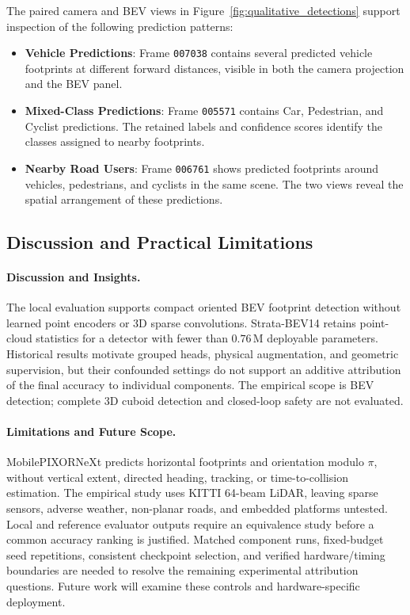 The paired camera and BEV views in Figure~\ref{fig:qualitative_detections} support inspection of the following prediction patterns:
\begin{itemize}
    \item \textbf{Vehicle Predictions}: Frame \texttt{007038} contains several predicted vehicle footprints at different forward distances, visible in both the camera projection and the BEV panel.
    \item \textbf{Mixed-Class Predictions}: Frame \texttt{005571} contains Car, Pedestrian, and Cyclist predictions. The retained labels and confidence scores identify the classes assigned to nearby footprints.
    \item \textbf{Nearby Road Users}: Frame \texttt{006761} shows predicted footprints around vehicles, pedestrians, and cyclists in the same scene. The two views reveal the spatial arrangement of these predictions.
\end{itemize}

\subsection{Discussion and Practical Limitations}
\label{sec:discussion_limitations}

\paragraph{Discussion and Insights.}
The local evaluation supports compact oriented BEV footprint detection without learned point encoders or 3D sparse convolutions. Strata-BEV14 retains point-cloud statistics for a detector with fewer than $0.76\,\text{M}$ deployable parameters. Historical results motivate grouped heads, physical augmentation, and geometric supervision, but their confounded settings do not support an additive attribution of the final accuracy to individual components. The empirical scope is BEV detection; complete 3D cuboid detection and closed-loop safety are not evaluated.

\paragraph{Limitations and Future Scope.}
MobilePIXORNeXt predicts horizontal footprints and orientation modulo $\pi$, without vertical extent, directed heading, tracking, or time-to-collision estimation. The empirical study uses KITTI 64-beam LiDAR, leaving sparse sensors, adverse weather, non-planar roads, and embedded platforms untested. Local and reference evaluator outputs require an equivalence study before a common accuracy ranking is justified. Matched component runs, fixed-budget seed repetitions, consistent checkpoint selection, and verified hardware/timing boundaries are needed to resolve the remaining experimental attribution questions. Future work will examine these controls and hardware-specific deployment.
